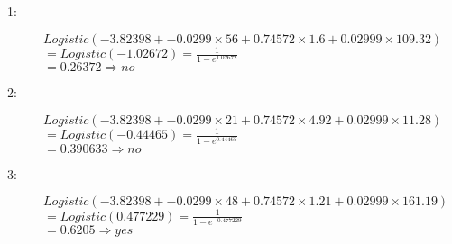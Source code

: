 \documentclass[--SOLUTION-OPTION--]{ditpaper}
\begin{document}
\begin{enumerate}
\begin{answer}
		\begin{description}
		\item[1:] $Logistic(-3.82398+-0.0299\times56+0.74572\times1.6+0.02999\times109.32)$ \\
		$=Logistic(-1.02672) =\frac{1}{1-e^{1.02672}}$\\
		$=0.26372 \Rightarrow \textit{no}$
		\item[2:] $Logistic(-3.82398+-0.0299\times21+0.74572\times4.92+0.02999\times11.28)$ \\
		$=Logistic(-0.44465)  =\frac{1}{1-e^{0.44465}}$ \\
		$=0.390633 \Rightarrow \textit{no}$
		\item[3:] $Logistic(-3.82398+-0.0299\times48+0.74572\times1.21+0.02999\times161.19)$ \\
		$=Logistic(0.477229)   =\frac{1}{1-e^{-0.477229}}$ \\
		$=0.6205 \Rightarrow \textit{yes}$
		\end{description}
		\end{answer}
\end{enumerate}
\end{document}
